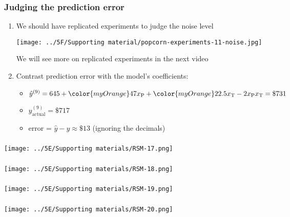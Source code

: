 \begin{frame}\frametitle{Judging the prediction error}
	\begin{enumerate}
		\item	We should have replicated experiments to judge the noise level
		
		\centerline{
			\texttt{[image: ../5F/Supporting material/popcorn-experiments-11-noise.jpg]}}
		{\small We will see more on replicated experiments in the next video}
		
		\vspace{1cm}
		\pause
		
		\item	Contrast prediction error with the model's coefficients:
		\begin{itemize}
			\item	$\hat{y}^{(9)}  = 645 + {\color{myOrange}47} x_\text{P}+ {\color{myOrange}22.5} x_\text{T} - 2x_\text{P}x_\text{T} = \$731$
			\item	$y_\text{actual}^{(9)} = \$717$ 
			\item	error = $\hat{y} - y \approx \$ 13 $ (ignoring the decimals)
		\end{itemize}
		
	\end{enumerate}
\end{frame}

\begin{frame}\frametitle{}
	\centerline{\texttt{[image: ../5E/Supporting materials/RSM-17.png]}}
\end{frame}
\begin{frame}\frametitle{}
	\centerline{\texttt{[image: ../5E/Supporting materials/RSM-18.png]}}
\end{frame}
\begin{frame}\frametitle{}
	\centerline{\texttt{[image: ../5E/Supporting materials/RSM-19.png]}}
\end{frame}
\begin{frame}\frametitle{}
	\centerline{\texttt{[image: ../5E/Supporting materials/RSM-20.png]}}
\end{frame}

